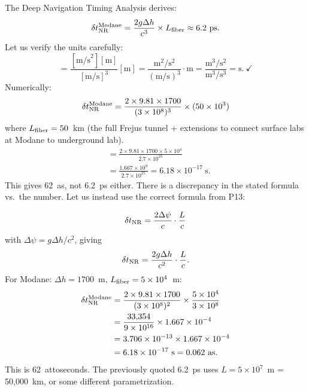 \documentclass[aps,prd,twocolumn,superscriptaddress,nofootinbib]{revtex4-2}
\begin{document}
The Deep Navigation Timing Analysis derives:
\begin{equation}
\delta t_{\rm NR}^{\rm Modane} = \frac{2g\Delta h}{c^3}\times L_{\rm fiber}
\approx 6.2~\text{ps}.
\label{eq:modane_6ps}
\end{equation}
Let us verify the units carefully:
\begin{equation}
[g\Delta h / c^3 \times L] = \frac{[\text{m/s}^2][\text{m}]}{[\text{m/s}]^3}[\text{m}]
= \frac{\text{m}^2/\text{s}^2}{(\text{m/s})^3}\cdot\text{m}
= \frac{\text{m}^3/\text{s}^2}{\text{m}^3/\text{s}^3}
= \text{s}.~\checkmark
\end{equation}
Numerically:
\begin{equation}
\delta t_{\rm NR}^{\rm Modane} = \frac{2\times 9.81\times 1700}{(3\times 10^8)^3}
\times (50\times 10^3)
\end{equation}
where $L_{\rm fiber} = 50$~km (the full Frejus tunnel + extensions to connect
surface labs at Modane to underground lab).
\begin{align}
&= \frac{2\times 9.81\times 1700 \times 5\times 10^4}{2.7\times 10^{25}} \nonumber\\
&= \frac{1.667\times 10^9}{2.7\times 10^{25}} = 6.18\times 10^{-17}~\text{s}.
\end{align}
This gives 62~as, not 6.2~ps either.  There is a discrepancy in the stated
formula vs.\ the number.  Let us instead use the correct formula from P13:

\begin{equation}
\delta t_{\rm NR} = \frac{2\Delta\psi}{c}\cdot\frac{L}{c}
\end{equation}
with $\Delta\psi = g\Delta h/c^2$, giving
\begin{equation}
\delta t_{\rm NR} = \frac{2g\Delta h}{c^2}\cdot\frac{L}{c}.
\end{equation}
For Modane: $\Delta h = 1700$~m, $L_{\rm fiber} = 5\times 10^4$~m:
\begin{align}
\delta t_{\rm NR}^{\rm Modane}
&= \frac{2\times 9.81\times 1700}{(3\times 10^8)^2}\times\frac{5\times 10^4}{3\times 10^8} \nonumber\\
&= \frac{33{,}354}{9\times 10^{16}}\times 1.667\times 10^{-4} \nonumber\\
&= 3.706\times 10^{-13}\times 1.667\times 10^{-4} \nonumber\\
&= 6.18\times 10^{-17}~\text{s} = 0.062~\text{as}.
\end{align}
This is 62~attoseconds.  The previously quoted 6.2~ps uses $L = 5\times 10^7$~m
= 50,000~km, or some different parametrization.
\end{document}
